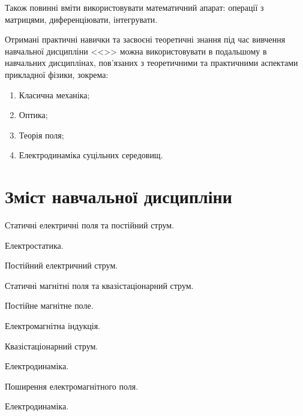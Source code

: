 \documentclass{Syllabus}
\begin{document}
Також повинні вміти використовувати математичний апарат: операції з матрицями,  диференціювати, інтегрувати.

Отримані практичні навички та засвоєні теоретичні знання під час вивчення навчальної дисципліни <<\discipline>> можна використовувати в подальшому в навчальних дисциплінах, пов’язаних з теоретичними та практичними аспектами прикладної фізики, зокрема:

\begin{enumerate}
	\item Класична механіка;
	\item Оптика;
	\item Теорія поля;
	\item Електродинаміка суцільних середовищ.
\end{enumerate}


\section{Зміст навчальної дисципліни}


\begin{Rozdil}
	\item Статичні електричні поля та постійний струм.
	\begin{Rozdil}
		\item Електростатика.
		\item Постійний електричний струм.
	\end{Rozdil}
	\item Статичні магнітні поля та квазістаціонарний струм.
	\begin{Rozdil}
		\item Постійне магнітне поле.
		\item Електромагнітна індукція.
		\item Квазістаціонарний струм.
	\end{Rozdil}
	\item Електродинаміка.
	\begin{Rozdil}
		\item Поширення електромагнітного поля.
		\item Електродинаміка.
	\end{Rozdil}
\end{Rozdil}

%
\end{document}
